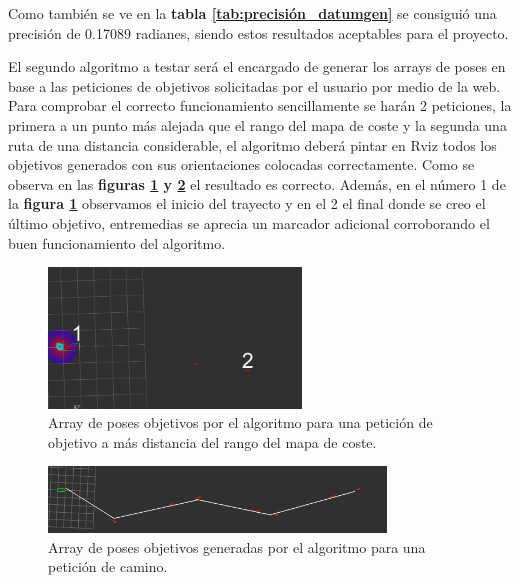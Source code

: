Como también se ve en la \textbf{tabla \ref{tab:precisión_datumgen}} se consiguió una precisión de 0.17089 radianes, siendo estos resultados aceptables 
para el proyecto.

El segundo algoritmo a testar será el encargado de generar los arrays de poses en base a las peticiones de objetivos solicitadas por el usuario por medio de 
la web. Para comprobar el correcto funcionamiento sencillamente se harán 2 peticiones, la primera a un punto más alejada que el rango del mapa de coste y la segunda una ruta de una distancia considerable, el algoritmo deberá pintar en Rviz 
todos los objetivos generados con sus orientaciones colocadas correctamente. Como se observa en las 
\textbf{figuras \ref{fig:puntos_intermedios_mas_50m} y \ref{fig:puntos_intermedios_camino}} el resultado es correcto. Además, en el número 1 de la \textbf{figura \ref{fig:puntos_intermedios_mas_50m}} 
observamos el inicio del trayecto y en el 2 el final donde se creo el último objetivo, entremedias se aprecia un marcador adicional corroborando el buen funcionamiento del algoritmo.
\begin{figure}[H]
    \centering
    \includegraphics[width=0.6\textwidth]{images/punto_alejado.png}
    \caption{Array de poses objetivos por el algoritmo para una petición de objetivo a más distancia del rango del mapa de coste.}
    \label{fig:puntos_intermedios_mas_50m}
\end{figure}

\begin{figure}[H]
    \centering
    \includegraphics[width=0.8\textwidth]{images/camino_punto_inter.png}
    \caption{Array de poses objetivos generadas por el algoritmo para una petición de camino.}
    \label{fig:puntos_intermedios_camino}
\end{figure}

